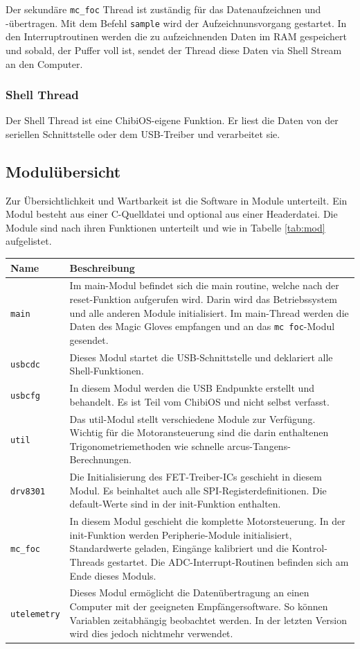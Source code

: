 Der sekundäre \texttt{mc\_foc} Thread ist zuständig für das Datenaufzeichnen und -übertragen. Mit dem Befehl \texttt{sample} wird der Aufzeichnunsvorgang gestartet. In den Interruptroutinen werden die zu aufzeichnenden Daten im RAM gespeichert und sobald, der Puffer voll ist, sendet der Thread diese Daten via Shell Stream an den Computer.

\subsubsection*{Shell Thread}
Der Shell Thread ist eine ChibiOS-eigene Funktion. Er liest die Daten von der seriellen Schnittstelle oder dem USB-Treiber und verarbeitet sie.

\subsection*{Modulübersicht}
Zur Übersichtlichkeit und Wartbarkeit ist die Software in Module unterteilt. Ein Modul besteht aus einer C-Quelldatei und optional aus einer Headerdatei. Die Module sind nach ihren Funktionen unterteilt und wie in Tabelle \ref{tab:mod} aufgelistet.\\
\begin{tabularx}{\textwidth}{l|X}
	Name & Beschreibung \\ \hline
	\texttt{main} & Im main-Modul befindet sich die main routine, welche nach der reset-Funktion aufgerufen wird. Darin wird das Betriebssystem und alle anderen Module initialisiert. Im main-Thread werden die Daten des Magic Gloves empfangen und an das \texttt{mc foc}-Modul gesendet. \\ \hline
	\texttt{usbcdc} & Dieses Modul startet die USB-Schnittstelle und deklariert alle Shell-Funktionen. \\ \hline
	\texttt{usbcfg} & In diesem Modul werden die USB Endpunkte erstellt und behandelt. Es ist Teil vom ChibiOS und nicht selbst verfasst. \\ \hline
	\texttt{util} & Das util-Modul stellt verschiedene Module zur Verfügung. Wichtig für die Motoransteuerung sind die darin enthaltenen Trigonometriemethoden wie schnelle arcus-Tangens-Berechnungen. \\ \hline
	\texttt{drv8301} & Die Initialisierung des FET-Treiber-ICs geschieht in diesem Modul. Es beinhaltet auch alle SPI-Registerdefinitionen. Die default-Werte sind in der init-Funktion enthalten. \\ \hline
	\texttt{mc\_foc} & In diesem Modul geschieht die komplette Motorsteuerung. In der init-Funktion werden Peripherie-Module initialisiert, Standardwerte geladen, Eingänge kalibriert und die Kontrol-Threads gestartet. Die ADC-Interrupt-Routinen befinden sich am Ende dieses Moduls.\\ \hline
	\texttt{utelemetry} & Dieses Modul ermöglicht die Datenübertragung an einen Computer mit der geeigneten Empfängersoftware. So können Variablen zeitabhängig beobachtet werden. In der letzten Version wird dies jedoch nichtmehr verwendet. \\ \hline
\end{tabularx}
\label{tab:mod}

